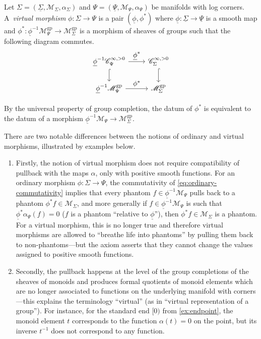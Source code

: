 \documentclass[10pt]{amsart}
\let\tst\textstyle
\theoremstyle{definition}
\theoremstyle{remark}
\newenvironment{remark}
  {\pushQED{\qed}\renewcommand{\qedsymbol}{$\lozenge$}\remarkx}
  {\popQED\endremarkx}
\let\defn\emph
\newcommand{\cM}{\mathscr{M}}
\newcommand{\cMgp}{\mathscr{M}^{\mathrm{gp}}}
\newcommand{\Cinfpos}[1]{\mathscr{C}^{\infty, > 0}_{#1}}
\newcommand{\Sig}{\Sigma}
\newcommand{\uSig}{\underline{\Sigma}}
\newcommand{\uphi}{\underline{\phi}}
\newcommand{\uPsi}{\underline{\Psi}}
\begin{document}
\begin{definition}\label{def:weak-morph}
Let $\Sig = (\uSig,\cM_\Sig,\alpha_\Sig)$ and $\Psi = (\uPsi,\cM_\Psi,\alpha_\Psi)$ be manifolds with log corners. A~\defn{virtual morphism} $\phi\colon\Sig\to \Psi$ is a pair $(\underline{\phi},\phi^*)$ where $\underline{\phi}\colon \uSig \to \uPsi$ is a smooth map and $\phi^*\colon \underline{\phi}^{-1}\cMgp_\Psi \to \cMgp_\Sig$ is a morphism of sheaves of groups such that the following diagram commutes.
\[
\begin{tikzcd}
\uphi^{-1}\Cinfpos{\Psi} \ar[r,"\tst \uphi^*"] \ar[d,hook] & \Cinfpos{\Sig} \ar[d,hook] \\
\uphi^{-1}\cMgp_{\Psi} \ar[r,"\tst \phi^*"] & \cMgp_{\Sig}
\end{tikzcd}
\]
\end{definition}

\begin{remark}
By the universal property of group completion, the datum of $\phi^*$ is equivalent to the datum of a morphism $\uphi^{-1}\cM_\Psi \to \cMgp_\Sig$.
\end{remark}

There are two notable differences between the notions of ordinary and virtual morphisms, illustrated by examples below.
\begin{enumerate}
\item Firstly, the notion of virtual morphism does not require compatibility of pullback with the maps $\alpha$, only with positive smooth functions. For an ordinary morphism $\phi \colon \Sig \to \Psi$, the commutativity of \eqref{eq:ordinary-commutativity} implies that every phantom $f \in \uphi^{-1}\cM_\Psi$ pulls back to a phantom $\phi^*f \in \cM_\Sig$, and more generally if $f \in \uphi^{-1}\cM_\Psi$ is such that $\uphi^*\alpha_\Psi(f)= 0$ (\ie $f$ is a phantom ``relative to $\uphi$''), then $\phi^*f\in\cM_\Sig$ is a phantom. For a virtual morphism, this is no longer true and therefore virtual morphisms are allowed to ``breathe life into phantoms'' by pulling them back to non-phantoms---but the axiom asserts that they cannot change the values assigned to positive smooth functions.
\item Secondly, the pullback happens at the level of the group completions of the sheaves of monoids and produces formal quotients of monoid elements which are no longer associated to functions on the underlying manifold with corners---this explains the terminology ``virtual'' (as in ``virtual representation of a group''). For instance, for the standard end $[0)$ from \autoref{ex:endpoint}, the monoid element $t$ corresponds to the function $\alpha(t)=0$ on the point, but its inverse $t^{-1}$ does not correspond to any function.
\end{enumerate}
\end{document}
